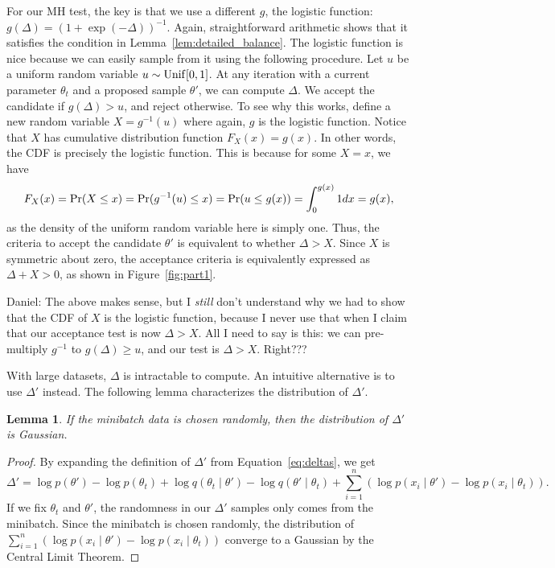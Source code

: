 \documentclass{article}
\newtheorem{lemma}{Lemma}
\begin{document}
For our MH test, the key is that we use a different $g$, the logistic function: $g(\Delta) =
(1+\exp(-\Delta))^{-1}$. Again, straightforward arithmetic shows that it satisfies the condition in
Lemma~\ref{lem:detailed_balance}.  The logistic function is nice because we can easily sample from
it using the following procedure. Let $u$ be a uniform random variable $u \sim {\rm Unif}[0,1]$. At
any iteration with a current parameter $\theta_t$ and a proposed sample $\theta'$, we can compute
$\Delta$. We accept the candidate if $g(\Delta) > u$, and reject otherwise. To see why this works,
define a new random variable $X = g^{-1}(u)$ where again, $g$ is the logistic function. Notice that
$X$ has cumulative distribution function $F_X(x) = g(x)$. In other words, the CDF is precisely the
logistic function. This is because for some $X = x$, we have
\[
F_X(x) = {\rm Pr}(X \le x) = {\rm Pr}(g^{-1}(u) \le x) = {\rm Pr}(u \le g(x)) = \int_{0}^{g(x)} 1 dx = g(x),
\]
as the density of the uniform random variable here is simply one. Thus, the criteria to accept the
candidate $\theta'$ is equivalent to whether $\Delta > X$. Since $X$ is symmetric about zero, the
acceptance criteria is equivalently expressed as $\Delta + X>0$, as shown in Figure~\ref{fig:part1}.

{\color{blue}
Daniel: The above makes sense, but I \emph{still} don't understand why we had to show that the CDF
of $X$ is the logistic function, because I never use that when I claim that our acceptance test is
now $\Delta > X$. All I need to say is this: we can pre-multiply $g^{-1}$ to $g(\Delta) \ge u$, and
our test is $\Delta > X$. Right???
}

With large datasets, $\Delta$ is intractable to compute. An intuitive alternative is to use
$\Delta'$ instead. The following lemma characterizes the distribution of $\Delta'$.

\begin{lemma}\label{lem:gaussian}
If the minibatch data is chosen randomly, then the distribution of $\Delta'$ is Gaussian.
\end{lemma}

\begin{proof}
By expanding the definition of $\Delta'$ from Equation~\ref{eq:deltas}, we get
\[
\Delta' = \log p(\theta') - \log p(\theta_t) + \log q(\theta_t \mid \theta') - \log q(\theta' \mid \theta_t) +
\sum_{i=1}^n (\log p(x_i\mid \theta') - \log p(x_i\mid \theta_t)).
\]
If we fix $\theta_t$ and $\theta'$, the randomness in our $\Delta'$ samples only comes from the
minibatch. Since the minibatch is chosen randomly, the distribution of $\sum_{i=1}^n (\log p(x_i\mid
\theta') - \log p(x_i\mid \theta_t))$ converge to a Gaussian by the Central Limit Theorem.
\end{proof}
\end{document}
